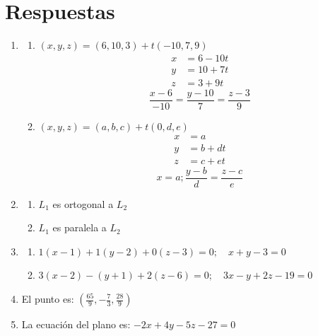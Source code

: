 \documentclass[12pt,letterpaper]{article}
\begin{document}
\section*{Respuestas}
\begin{enumerate}
    \item 
    \begin{enumerate}
        \item $(x,y,z) = (6,10,3) + t(-10,7,9)$\[
\begin{aligned}
x &= 6-10t \\
y &= 10+7t \\
z &= 3+9t
\end{aligned}
\]
\[\displaystyle \frac{x - 6}{-10} = \frac{y - 10}{7} = \frac{z - 3}{9}
\]
        \item $(x,y,z) = (a,b,c) + t(0,d,e)$\[
\begin{aligned}
x &= a \\
y &= b+dt \\
z &= c+et
\end{aligned}
\]
\[\displaystyle x=a; \frac{y - b}{d} = \frac{z - c}{e}
\]
    \end{enumerate}
    \item
    \begin{enumerate}
        \item $L_1$ es ortogonal a $L_2$
        \item $L_1$ es paralela a $L_2$
    \end{enumerate}
    \item 
    \begin{enumerate}
        \item $1(x-1)+1(y-2)+0(z-3)=0;\quad x+y-3=0$
        \item $3(x-2)-(y+1)+2(z-6)=0;\quad3x-y+2z-19=0$
    \end{enumerate}
    \item El punto es: $(\frac{65}{9}, -\frac{7}{3}, \frac{28}{9})$
    \item La ecuación del plano es: $-2x+4y-5z-27=0$
\end{enumerate}
\end{document}
